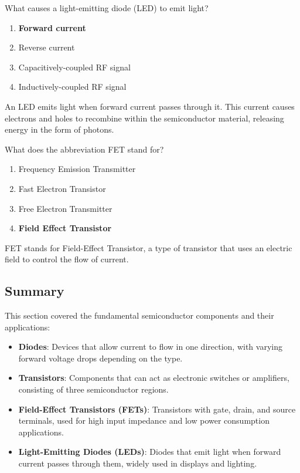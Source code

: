 \begin{tcolorbox}[colback=gray!10!white,colframe=black!75!black,title={T6B07}]
    What causes a light-emitting diode (LED) to emit light?
    \begin{enumerate}[label=\Alph*,noitemsep]
        \item \textbf{Forward current}
        \item Reverse current
        \item Capacitively-coupled RF signal
        \item Inductively-coupled RF signal
    \end{enumerate}
\end{tcolorbox}
An LED emits light when forward current passes through it. This current causes electrons and holes to recombine within the semiconductor material, releasing energy in the form of photons. %

\begin{tcolorbox}[colback=gray!10!white,colframe=black!75!black,title={T6B08}]
    What does the abbreviation FET stand for?
    \begin{enumerate}[label=\Alph*,noitemsep]
        \item Frequency Emission Transmitter
        \item Fast Electron Transistor
        \item Free Electron Transmitter
        \item \textbf{Field Effect Transistor}
    \end{enumerate}
\end{tcolorbox}
FET stands for Field-Effect Transistor, a type of transistor that uses an electric field to control the flow of current. %

\subsection*{Summary}
This section covered the fundamental semiconductor components and their applications:
\begin{itemize}
    \item \textbf{Diodes}: Devices that allow current to flow in one direction, with varying forward voltage drops depending on the type.
    \item \textbf{Transistors}: Components that can act as electronic switches or amplifiers, consisting of three semiconductor regions.
    \item \textbf{Field-Effect Transistors (FETs)}: Transistors with gate, drain, and source terminals, used for high input impedance and low power consumption applications.
    \item \textbf{Light-Emitting Diodes (LEDs)}: Diodes that emit light when forward current passes through them, widely used in displays and lighting.
\end{itemize}
